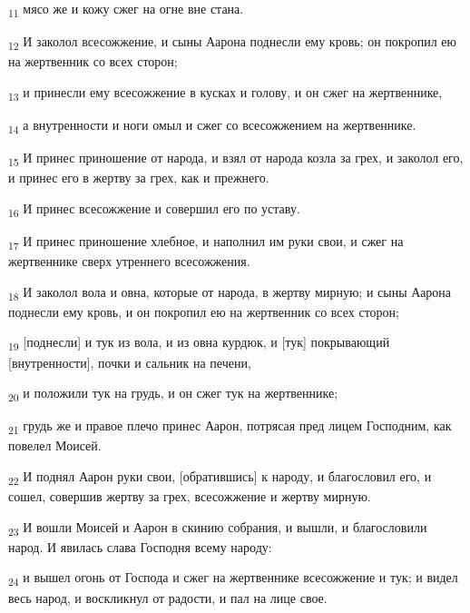 \begin{tcolorbox}
\textsubscript{11} мясо же и кожу сжег на огне вне стана.
\end{tcolorbox}
\begin{tcolorbox}
\textsubscript{12} И заколол всесожжение, и сыны Аарона поднесли ему кровь; он покропил ею на жертвенник со всех сторон;
\end{tcolorbox}
\begin{tcolorbox}
\textsubscript{13} и принесли ему всесожжение в кусках и голову, и он сжег на жертвеннике,
\end{tcolorbox}
\begin{tcolorbox}
\textsubscript{14} а внутренности и ноги омыл и сжег со всесожжением на жертвеннике.
\end{tcolorbox}
\begin{tcolorbox}
\textsubscript{15} И принес приношение от народа, и взял от народа козла за грех, и заколол его, и принес его в жертву за грех, как и прежнего.
\end{tcolorbox}
\begin{tcolorbox}
\textsubscript{16} И принес всесожжение и совершил его по уставу.
\end{tcolorbox}
\begin{tcolorbox}
\textsubscript{17} И принес приношение хлебное, и наполнил им руки свои, и сжег на жертвеннике сверх утреннего всесожжения.
\end{tcolorbox}
\begin{tcolorbox}
\textsubscript{18} И заколол вола и овна, которые от народа, в жертву мирную; и сыны Аарона поднесли ему кровь, и он покропил ею на жертвенник со всех сторон;
\end{tcolorbox}
\begin{tcolorbox}
\textsubscript{19} [поднесли] и тук из вола, и из овна курдюк, и [тук] покрывающий [внутренности], почки и сальник на печени,
\end{tcolorbox}
\begin{tcolorbox}
\textsubscript{20} и положили тук на грудь, и он сжег тук на жертвеннике;
\end{tcolorbox}
\begin{tcolorbox}
\textsubscript{21} грудь же и правое плечо принес Аарон, потрясая пред лицем Господним, как повелел Моисей.
\end{tcolorbox}
\begin{tcolorbox}
\textsubscript{22} И поднял Аарон руки свои, [обратившись] к народу, и благословил его, и сошел, совершив жертву за грех, всесожжение и жертву мирную.
\end{tcolorbox}
\begin{tcolorbox}
\textsubscript{23} И вошли Моисей и Аарон в скинию собрания, и вышли, и благословили народ. И явилась слава Господня всему народу:
\end{tcolorbox}
\begin{tcolorbox}
\textsubscript{24} и вышел огонь от Господа и сжег на жертвеннике всесожжение и тук; и видел весь народ, и воскликнул от радости, и пал на лице свое.
\end{tcolorbox}
